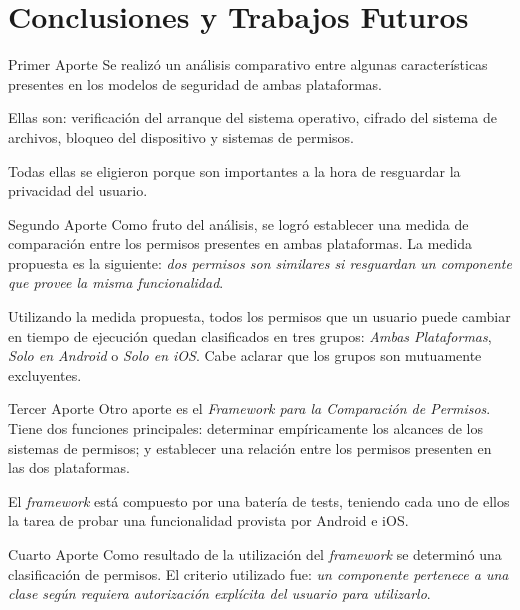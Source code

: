 \chapter{Conclusiones y Trabajos Futuros}
\begin{paragraph}{Primer Aporte}
Se realizó un análisis comparativo entre algunas características presentes en los modelos de seguridad de ambas plataformas.

Ellas son: verificación del arranque del sistema operativo,  cifrado del sistema de archivos,  bloqueo del dispositivo  y sistemas de permisos.

Todas ellas se eligieron porque son importantes a la hora de resguardar la privacidad del usuario.
\end{paragraph}
\begin{paragraph}{Segundo Aporte}
Como fruto del análisis, se logró establecer una medida de comparación entre los permisos presentes en ambas plataformas.  La medida propuesta es la siguiente: \emph{dos permisos son similares si resguardan un componente que provee la misma funcionalidad}.

Utilizando la medida propuesta, todos los permisos que un usuario puede cambiar en tiempo de ejecución quedan clasificados en tres grupos:  \emph{Ambas Plataformas},  \emph{Solo en Android}  o \emph{Solo en iOS}. Cabe aclarar que los grupos son mutuamente excluyentes.
\end{paragraph}
\begin{paragraph}{Tercer Aporte}
Otro aporte es el \emph{Framework para la Comparación de Permisos}. Tiene dos funciones principales: determinar empíricamente los alcances de los sistemas de permisos;  y establecer una relación entre los permisos presenten en las dos plataformas.

El \emph{framework} está compuesto por una batería de tests, teniendo cada uno de ellos la tarea de probar una funcionalidad provista por Android e iOS.
\end{paragraph} 
\begin{paragraph}{Cuarto Aporte}
Como resultado de la utilización del \emph{framework} se determinó una clasificación de permisos. El criterio utilizado fue: \emph{un componente pertenece a una clase según requiera autorización explícita del usuario para utilizarlo}.
\end{paragraph}

